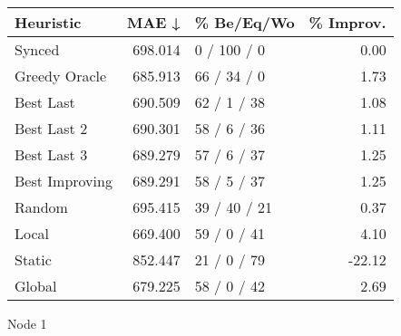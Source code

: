 \begin{tabular}{lrlr}
\toprule
\textbf{Heuristic} & \textbf{MAE ↓} & \textbf{\% Be/Eq/Wo} & \textbf{\% Improv.} \\
\midrule
            Synced &        698.014 &          0 / 100 / 0 &                0.00 \\
     Greedy Oracle &        685.913 &          66 / 34 / 0 &                1.73 \\
         Best Last &        690.509 &          62 / 1 / 38 &                1.08 \\
       Best Last 2 &        690.301 &          58 / 6 / 36 &                1.11 \\
       Best Last 3 &        689.279 &          57 / 6 / 37 &                1.25 \\
    Best Improving &        689.291 &          58 / 5 / 37 &                1.25 \\
            Random &        695.415 &         39 / 40 / 21 &                0.37 \\
             Local &        669.400 &          59 / 0 / 41 &                4.10 \\
            Static &        852.447 &          21 / 0 / 79 &              -22.12 \\
            Global &        679.225 &          58 / 0 / 42 &                2.69 \\
\bottomrule
\end{tabular}
\caption{Node 1}
\label{tab:non_lr05_le1_bs2_1}

